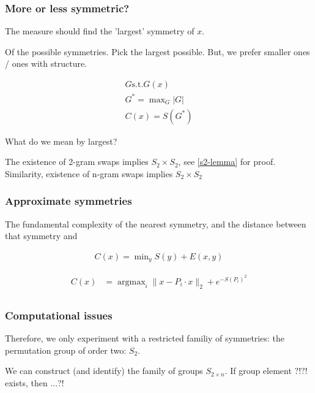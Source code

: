 \subsubsection{More or less symmetric?}

The measure should find the 'largest' symmetry of $x$.

Of the possible symmetries. Pick the largest possible. But, we prefer smaller ones / ones with structure.

\begin{align*}
G \text{s.t.} G(x) \\
G^{* } = \mathop{\text{max}}_G |G| \\
C(x) = S(G^{* })
\end{align*}

What do we mean by largest?

The existence of 2-gram swaps implies $S_2 \times S_2$, see \ref{s2-lemma} for proof.
Similarity, existence of n-gram swaps implies $S_2 \times S_2$

\subsubsection{Approximate symmetries}

The fundamental complexity of the nearest symmetry, and the distance between that symmetry and

\begin{align*}
C(x) = \mathop{\text{min}}_y S(y) + E(x, y)
\end{align*}

\begin{align*}
C(x) &= \mathop{\text{argmax}}_i  \parallel x-P_i\cdot x\parallel_2 + e^{-S(P_i)^2}\\
\end{align*}


\subsubsection{Computational issues}

Therefore, we only experiment with a restricted familiy of symmetries: the permutation group of order two: $S_2$.

We can construct (and identify) the family of groups $S_{2\times n}$.
If group element $?!?!$ exists, then ...?!

